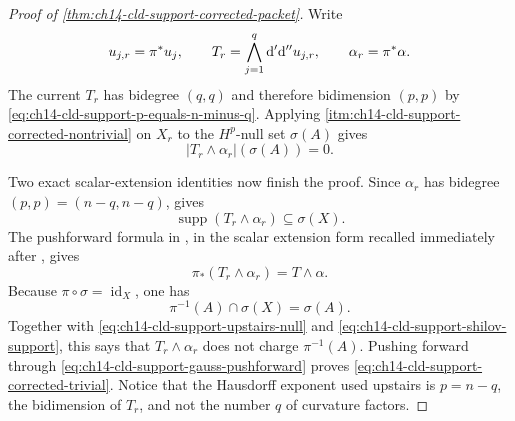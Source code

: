 \begin{proof}[Proof of
\cref{thm:ch14-cld-support-corrected-packet}]
Write
\[
 u_{j,r}=\pi^*u_j,
 \qquad
 T_r=\bigwedge_{j=1}^q\mathrm d'\mathrm d'' u_{j,r},
 \qquad
 \alpha_r=\pi^*\alpha.
\]
The current $T_r$ has bidegree $(q,q)$ and therefore bidimension
$(p,p)$ by \eqref{eq:ch14-cld-support-p-equals-n-minus-q}.  Applying
\cref{itm:ch14-cld-support-corrected-nontrivial} on $X_r$ to the
$H^p$-null set $\sigma(A)$ gives
\begin{equation}
\label{eq:ch14-cld-support-upstairs-null}
                         |T_r\wedge\alpha_r|(\sigma(A))=0.
\end{equation}

Two exact scalar-extension identities now finish the proof.  Since
$\alpha_r$ has bidegree $(p,p)=(n-q,n-q)$,
\cite[Proposition~16.8.2]{CLD25} gives
\begin{equation}
\label{eq:ch14-cld-support-shilov-support}
                \operatorname{supp}(T_r\wedge\alpha_r)
                                  \subseteq\sigma(X).
\end{equation}
The pushforward formula in \cite[Proposition~8.7.5]{CLD25}, in the scalar
extension form recalled immediately after
\cite[Proposition~16.8.2]{CLD25}, gives
\begin{equation}
\label{eq:ch14-cld-support-gauss-pushforward}
                  \pi_*(T_r\wedge\alpha_r)=T\wedge\alpha.
\end{equation}
Because $\pi\circ\sigma=\operatorname{id}_X$, one has
\[
        \pi^{-1}(A)\cap\sigma(X)=\sigma(A).
\]
Together with
\eqref{eq:ch14-cld-support-upstairs-null} and
\eqref{eq:ch14-cld-support-shilov-support}, this says that
$T_r\wedge\alpha_r$ does not charge $\pi^{-1}(A)$.  Pushing forward through
\eqref{eq:ch14-cld-support-gauss-pushforward} proves
\eqref{eq:ch14-cld-support-corrected-trivial}.  Notice that the Hausdorff
exponent used upstairs is
$p=n-q$, the bidimension of $T_r$, and not the number $q$ of curvature
factors.
\end{proof}

